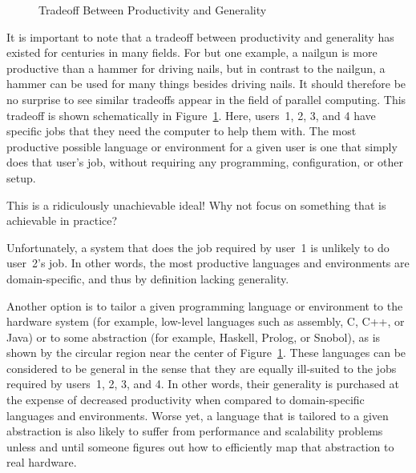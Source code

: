 \begin{figure}[tb]
\begin{center}
\end{center}
\caption{Tradeoff Between Productivity and Generality}
\label{fig:intro:Tradeoff Between Productivity and Generality}
\end{figure}

It is important to note that a tradeoff between productivity and
generality has existed for centuries in many fields.
For but one example, a nailgun is more productive than a hammer for
driving nails, but in contrast to the nailgun, a hammer can be used for
many things besides driving nails.
It should therefore be no surprise to see similar tradeoffs
appear in the field of parallel computing.
This tradeoff is shown schematically in
Figure~\ref{fig:intro:Tradeoff Between Productivity and Generality}.
Here, users~1, 2, 3, and 4 have specific jobs that they need the computer
to help them with.
The most productive possible language or environment for a given user is one
that simply does that user's job, without requiring any programming,
configuration, or other setup.

\QuickQuiz{}
	This is a ridiculously unachievable ideal!
	Why not focus on something that is achievable in practice?
 \QuickQuizEnd

Unfortunately, a system that does the job required by user~1 is
unlikely to do user~2's job.
In other words, the most productive languages and environments are
domain-specific, and thus by definition lacking generality.

Another option is to tailor a given programming language or environment
to the hardware system (for example, low-level languages such as
assembly, C, C++, or Java) or to some abstraction (for example,
Haskell, Prolog, or Snobol), as is shown by the circular region near
the center of
Figure~\ref{fig:intro:Tradeoff Between Productivity and Generality}.
These languages can be considered to be general in the sense that they
are equally ill-suited to the jobs required by users~1, 2, 3, and 4.
In other words, their generality is purchased at the expense of
decreased productivity when compared to domain-specific languages
and environments.
Worse yet, a language that is tailored to a given abstraction
is also likely to suffer from performance and scalability problems
unless and until someone figures out how to efficiently map that
abstraction to real hardware.

